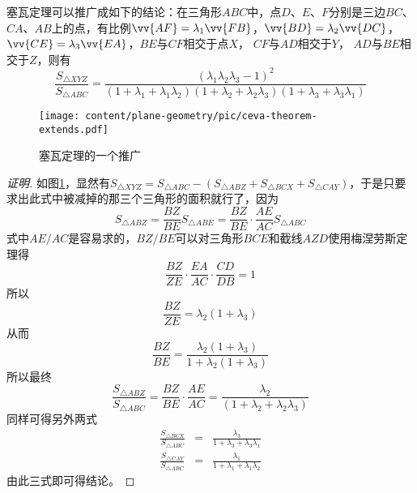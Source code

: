 \begin{example}
  塞瓦定理可以推广成如下的结论：在三角形$ABC$中，点$D$、$E$、$F$分别是三边$BC$、$CA$、$AB$上的点，有比例$\vv{AF}=\lambda_1\vv{FB}$，$\vv{BD}=\lambda_2\vv{DC}$，$\vv{CE}=\lambda_3\vv{EA}$，$BE$与$CF$相交于点$X$， $CF$与$AD$相交于$Y$， $AD$与$BE$相交于$Z$，则有
  \begin{equation*}
    \frac{S_{\triangle XYZ}}{S_{\triangle ABC}} = \frac{(\lambda_1\lambda_2\lambda_3-1)^2}{(1+\lambda_1+\lambda_1\lambda_2)(1+\lambda_2+\lambda_2\lambda_3)(1+\lambda_3+\lambda_3\lambda_1)}
  \end{equation*}
  
\begin{figure}[htbp]
\centering
\texttt{[image: content/plane-geometry/pic/ceva-theorem-extends.pdf]}
\caption{塞瓦定理的一个推广}
\label{fig:ceva-theorem-extends}
\end{figure}

\begin{proof}[证明]
  如图\ref{fig:ceva-theorem-extends}，显然有$S_{\triangle XYZ} = S_{\triangle ABC} - (S_{\triangle ABZ} + S_{\triangle BCX} + S_{\triangle CAY})$，于是只要求出此式中被减掉的那三个三角形的面积就行了，因为
  \begin{equation*}
    S_{\triangle ABZ} = \frac{BZ}{BE} S_{\triangle ABE} = \frac{BZ}{BE} \cdot \frac{AE}{AC} S_{\triangle ABC}
  \end{equation*}
  式中$AE/AC$是容易求的，$BZ/BE$可以对三角形$BCE$和截线$AZD$使用梅涅劳斯定理得
  \begin{equation*}
    \frac{BZ}{ZE} \cdot \frac{EA}{AC} \cdot \frac{CD}{DB} = 1
  \end{equation*}
  所以
  \begin{equation*}
    \frac{BZ}{ZE} = \lambda_2(1+\lambda_3)
  \end{equation*}
  从而
  \begin{equation*}
    \frac{BZ}{BE} = \frac{\lambda_2(1+\lambda_3)}{1+\lambda_2(1+\lambda_3)}
  \end{equation*}
  所以最终
  \begin{equation*}
    \frac{S_{\triangle ABZ}}{S_{\triangle ABC}} = \frac{BZ}{BE} \cdot \frac{AE}{AC} = \frac{\lambda_2}{(1+\lambda_2+\lambda_2\lambda_3)}
  \end{equation*}
  同样可得另外两式
  \begin{eqnarray*}
    \frac{S_{\triangle BCX}}{S_{\triangle ABC}} & = & \frac{\lambda_3}{1+\lambda_3+\lambda_3\lambda_1} \\
    \frac{S_{\triangle CAY}}{S_{\triangle ABC}} & = & \frac{\lambda_1}{1+\lambda_1+\lambda_1\lambda_2} 
  \end{eqnarray*}
  由此三式即可得结论。
\end{proof}

\end{example}

